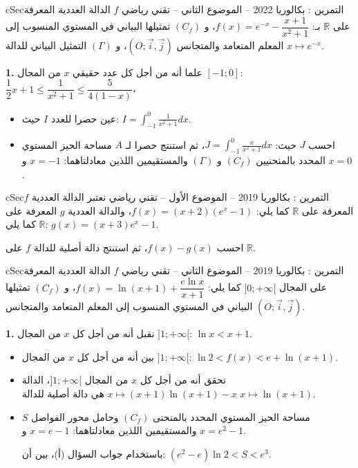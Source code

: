 \documentclass[12pt,a4paper]{article}
\newenvironment{BOX}[2]{\begin{otherlanguage}{english}\begin{arbox}{#1}{#2}}{\end{arbox}\end{otherlanguage}}
\newcounter{exo}
\newenvironment{tamrin}[1]{\stepcounter{exo}\begin{BOX}{cSec}{التمرين \theexo: #1}}{\end{BOX}}
\newcommand{\R}{\mathbb{R}}
\newenvironment{sq}{\begin{itemize}[leftmargin=2.4em,itemsep=3pt]}{\end{itemize}}
\newcommand{\qa}{\item[(أ)]}\newcommand{\qb}{\item[(ب)]}\newcommand{\qc}{\item[(جـ)]}\newcommand{\qd}{\item[(د)]}\newcommand{\qe}{\item[(هـ)]}
\newcommand{\QQ}[1]{\par\smallskip\textbf{#1.} }
\begin{document}
\begin{tamrin}{بكالوريا 2022 -- الموضوع الثاني -- تقني رياضي}
$f$ الدالة العددية المعرفة على $\R$ بـ: $f(x)=e^{-x}-\dfrac{x+1}{x^{2}+1}$، و $(C_f)$ تمثيلها البياني في المستوي المنسوب إلى المعلم المتعامد والمتجانس $(O;\vec{i},\vec{j})$، و $(\Gamma)$ التمثيل البياني للدالة $x\mapsto e^{-x}$.

\QQ{1} علما أنه من أجل كل عدد حقيقي $x$ من المجال $[-1;0]$: $\dfrac12x+1\le\dfrac{1}{x^{2}+1}\le\dfrac{5}{4(1-x)}$،
\begin{sq}
\qa عين حصرا للعدد $I$ حيث: $I=\displaystyle\int_{-1}^{0}\frac{1}{x^{2}+1}dx$.
\qb احسب $J$ حيث: $J=\displaystyle\int_{-1}^{0}\frac{x}{x^{2}+1}dx$، ثم استنتج حصرا لـ $A$ مساحة الحيز المستوي المحدد بالمنحنيين $(C_f)$ و $(\Gamma)$ والمستقيمين اللذين معادلتاهما: $x=-1$ و $x=0$.
\end{sq}
\end{tamrin}

\begin{tamrin}{بكالوريا 2019 -- الموضوع الأول -- تقني رياضي}
نعتبر الدالة العددية $f$ المعرفة على $\R$ كما يلي: $f(x)=(x+2)\left(e^{x}-1\right)$،
والدالة العددية $g$ المعرفة على $\R$ كما يلي: $g(x)=(x+3)e^{x}-1$.

احسب $f(x)-g(x)$، ثم استنتج دالة أصلية للدالة $f$ على $\R$.
\end{tamrin}

\begin{tamrin}{بكالوريا 2019 -- الموضوع الثاني -- تقني رياضي}
$f$ الدالة العددية المعرفة على المجال $]0;+\infty[$ كما يلي: $f(x)=\ln(x+1)+\dfrac{e\ln x}{x+1}$، و $(C_f)$ تمثيلها البياني في المستوي المنسوب إلى المعلم المتعامد والمتجانس $(O;\vec{i},\vec{j})$.

\QQ{1} نقبل أنه من أجل كل $x$ من المجال $]1;+\infty[$: $\ln x<x+1$.
\begin{sq}
\qa بين أنه من أجل كل $x$ من المجال $]1;+\infty[$: $\ln2<f(x)<e+\ln(x+1)$.
\qb تحقق أنه من أجل كل $x$ من المجال $]1;+\infty[$، الدالة $x\mapsto(x+1)\ln(x+1)-x$ هي دالة أصلية للدالة $x\mapsto\ln(x+1)$.
\qc $S$ مساحة الحيز المستوي المحدد بالمنحنى $(C_f)$ وحامل محور الفواصل والمستقيمين اللذين معادلتاهما: $x=e-1$ و $x=e^{2}-1$.

باستخدام جواب السؤال (أ)، بين أن: $\left(e^{2}-e\right)\ln2<S<e^{3}$.
\end{sq}
\end{tamrin}
\end{document}
